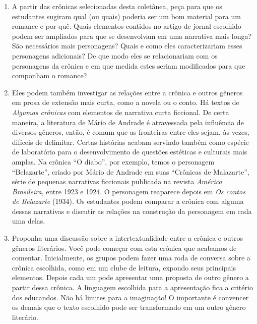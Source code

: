 \documentclass[12pt]{extarticle}
\begin{document}
\begin{enumerate}

\item
A partir das crônicas selecionadas desta
coletânea, peça para que os estudantes sugiram qual (ou quais) poderia
ser um bom material para um romance e por quê. Quais elementos contidos no
artigo de jornal escolhido podem ser ampliados para que se desenvolvam
em uma narrativa mais longa? São necessários mais personagens? Quais e
como eles caracterizariam esses personagens adicionais? De que modo eles
se relacionariam com os personagens da crônica e em que medida estes
seriam modificados para que componham o romance?

\item
Eles podem também investigar as relações entre a crônica e outros
gêneros em prosa de extensão mais curta, como a novela ou o conto. Há
textos de \emph{Algumas crônicas} com elementos de narrativa curta
ficcional. De certa maneira, a literatura de Mário de Andrade é
atravessada pela influência de diversos gêneros, então, é comum que as
fronteiras entre eles sejam, às vezes, difíceis de delimitar. Certas
histórias acabam servindo também como espécie de laboratório para o
desenvolvimento de questões estéticas e culturais mais amplas. Na
crônica ``O diabo'', por exemplo, temos o personagem ``Belazarte'',
criado por Mário de Andrade em suas ``Crônicas de Malazarte'', série de
pequenas narrativas ficcionais publicada na revista \emph{América
Brasileira}, entre 1923 e 1924. O personagem reaparece depois em
\emph{Os contos de Belazarte} (1934). Os estudantes podem comparar a
crônica com alguma dessas narrativas e discutir as relações na
construção da personagem em cada uma delas.




\item
Proponha uma discussão sobre a intertextualidade entre a crônica e
outros gêneros literários. Você pode começar com esta crônica que
acabamos de comentar. Inicialmente, os grupos podem fazer uma roda de
conversa sobre a crônica escolhida, como em um clube de leitura, expondo
seus principais elementos. Depois cada um pode apresentar uma proposta
de outro gênero a partir dessa crônica. A linguagem escolhida para a
apresentação fica a critério dos educandos. Não há limites para a
imaginação! O importante é convencer os demais que o texto escolhido
pode ser transformado em um outro gênero literário.
\end{enumerate}
\end{document}
